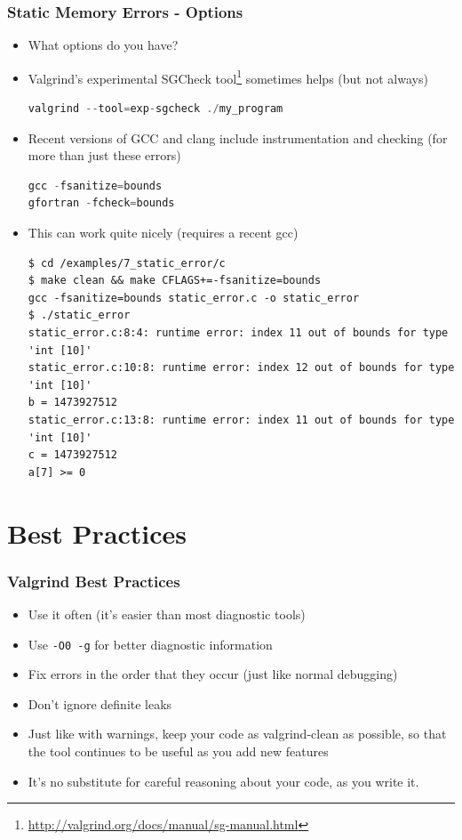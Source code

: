 \documentclass{beamer}
\begin{document}
\begin{frame}[fragile]
\frametitle{Static Memory Errors - Options}
\begin{itemize}
\item What options do you have?
\item Valgrind's experimental SGCheck tool\footnote{\url{http://valgrind.org/docs/manual/sg-manual.html}} sometimes helps (but not always)
\begin{lstlisting}[language=C++]
valgrind --tool=exp-sgcheck ./my_program
\end{lstlisting}
\item Recent versions of GCC and clang include instrumentation and checking (for more than just these errors)
\begin{lstlisting}[language=C++]
gcc -fsanitize=bounds
gfortran -fcheck=bounds
\end{lstlisting}
\item This can work quite nicely (requires a recent gcc)
\begin{lstlisting}
$ cd /examples/7_static_error/c
$ make clean && make CFLAGS+=-fsanitize=bounds
gcc -fsanitize=bounds static_error.c -o static_error
$ ./static_error
static_error.c:8:4: runtime error: index 11 out of bounds for type 'int [10]'
static_error.c:10:8: runtime error: index 12 out of bounds for type 'int [10]'
b = 1473927512
static_error.c:13:8: runtime error: index 11 out of bounds for type 'int [10]'
c = 1473927512
a[7] >= 0
\end{lstlisting}
\end{itemize}
\end{frame}

\section{Best Practices}

\begin{frame}[fragile]
\frametitle{Valgrind Best Practices}
\begin{itemize}
\item Use it often (it's easier than most diagnostic tools)
\item Use \texttt{-O0 -g} for better diagnostic information
\item Fix errors in the order that they occur (just like normal debugging)
\item Don't ignore definite leaks
\item Just like with warnings, keep your code as valgrind-clean as possible, so that the tool continues to be useful as you add new features
\item It's no substitute for careful reasoning about your code, as you write it.
\end{itemize}
\end{frame}
\end{document}
